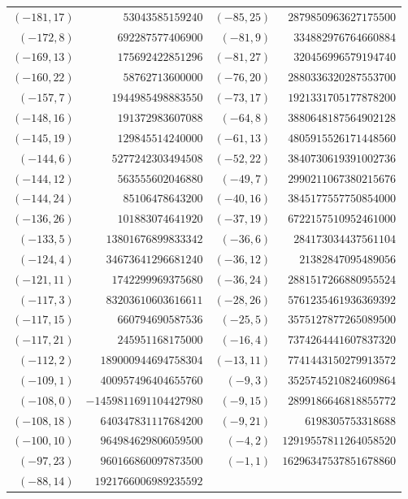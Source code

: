 {\scriptsize\begin{tabular}{@{}r@{\ \ }r@{\qquad}r@{\ \ }r@{}}
$(-181,17)$ & $53043585159240$ & $(-85,25)$ & $2879850963627175500$ \\
$(-172,8)$ & $692287577406900$ & $(-81,9)$ & $334882976764660884$ \\
$(-169,13)$ & $175692422851296$ & $(-81,27)$ & $320456996579194740$ \\
$(-160,22)$ & $58762713600000$ & $(-76,20)$ & $2880336320287553700$ \\
$(-157,7)$ & $1944985498883550$ & $(-73,17)$ & $1921331705177878200$ \\
$(-148,16)$ & $191372983607088$ & $(-64,8)$ & $3880648187564902128$ \\
$(-145,19)$ & $129845514240000$ & $(-61,13)$ & $4805915526171448560$ \\
$(-144,6)$ & $5277242303494508$ & $(-52,22)$ & $3840730619391002736$ \\
$(-144,12)$ & $563555602046880$ & $(-49,7)$ & $2990211067380215676$ \\
$(-144,24)$ & $85106478643200$ & $(-40,16)$ & $3845177557750854000$ \\
$(-136,26)$ & $101883074641920$ & $(-37,19)$ & $6722157510952461000$ \\
$(-133,5)$ & $13801676899833342$ & $(-36,6)$ & $284173034437561104$ \\
$(-124,4)$ & $34673641296681240$ & $(-36,12)$ & $21382847095489056$ \\
$(-121,11)$ & $1742299969375680$ & $(-36,24)$ & $2881517266880955524$ \\
$(-117,3)$ & $83203610603616611$ & $(-28,26)$ & $5761235461936369392$ \\
$(-117,15)$ & $660794690587536$ & $(-25,5)$ & $3575127877265089500$ \\
$(-117,21)$ & $245951168175000$ & $(-16,4)$ & $7374264441607837320$ \\
$(-112,2)$ & $189000944694758304$ & $(-13,11)$ & $7741443150279913572$ \\
$(-109,1)$ & $400957496404655760$ & $(-9,3)$ & $3525745210824609864$ \\
$(-108,0)$ & $-1459811691104427980$ & $(-9,15)$ & $2899186646818855772$ \\
$(-108,18)$ & $640347831117684200$ & $(-9,21)$ & $6198305753318688$ \\
$(-100,10)$ & $964984629806059500$ & $(-4,2)$ & $12919557811264058520$ \\
$(-97,23)$ & $960166860097873500$ & $(-1,1)$ & $16296347537851678860$ \\
$(-88,14)$ & $1921766006989235592$ & & \\
\end{tabular}}\par\medskip
